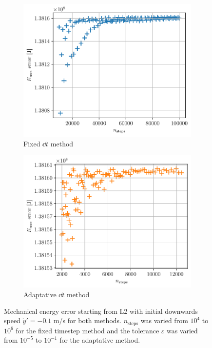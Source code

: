 \begin{figure}[h]
    \centering
    \begin{subfigure}{0.48\linewidth}
        \centering
        \includegraphics[width=\linewidth]{figures/lagrange_emec_error_fixed.pdf}
        \caption{Fixed \(\dd t\) method}
        \label{fig:lagrange_emec_error_fixed}
    \end{subfigure}
    \begin{subfigure}{0.48\linewidth}
        \centering
        \includegraphics[width=\linewidth]{figures/lagrange_emec_error_adapt.pdf}
        \caption{Adaptative \(\dd t\) method}
        \label{fig:lagrange_emec_error_adapt}
    \end{subfigure}
    \caption{Mechanical energy error starting from L2 with initial downwards speed \(\dot y' = -0.1\) m/s for both methods. \(n_\textrm{steps}\) was varied from \(10^4\) to \(10^6\) for the fixed timestep method and the tolerance \(\varepsilon\) was varied from \(10^{-5}\) to \(10^{-1}\) for the adaptative method.}
    \label{fig:lagrange_emec_error}
\end{figure}

